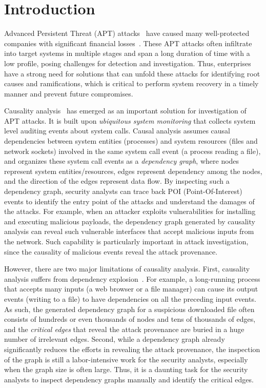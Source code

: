 \section{Introduction}
 Advanced Persistent Threat (APT) attacks~\cite{fireeye:anatomy,aptsymantec} have caused many well-protected companies with significant financial losses~\cite{ebay,opm,target,homedepot,ya:yahooleak}.
These APT attacks often infiltrate into target systems in multiple stages 
and span a long duration of time with a low profile, posing challenges for detection and investigation.
Thus, enterprises have a strong need for solutions that can unfold these attacks for identifying root causes and ramifications,
which is critical to perform system recovery in a timely manner and prevent future compromises.

Causality analysis~\cite{backtracking,backtracking2,wormlog,logtracking,mcitracking} has emerged as an important solution for investigation of APT attacks. It is built upon \emph{ubiquitous system monitoring} that collects system level auditing events about system calls.
Causal analysis assumes causal dependencies between system entities (\eg processes) and system resources (\eg files and network sockets) involved in the same system call event (\eg a process reading a file),
and organizes these system call events as a \emph{dependency graph}, where nodes represent system entities/resources, edges represent dependency among the nodes, and the direction of the edges represent data flow.
By inspecting such a dependency graph, security analysts can trace back POI (Point-Of-Interest) events to identify the entry point of the attacks and understand the damages of the attacks. 
For example, when an attacker exploits vulnerabilities for installing and executing malicious payloads, the dependency graph generated by causality analysis can reveal such vulnerable interfaces that accept malicious inputs from the network.
Such capability is particularly important in attack investigation, since the causality of malicious events reveal the attack provenance.

However, there are two major limitations of causality analysis.
First, causality analysis suffers from dependency explosion~\cite{depexplosion,timelytrack}.
For example, a long-running process that accepts many inputs (\eg a web browser or a file manager) can cause its output events (\eg writing to a file) to have dependencies on all the preceding input events.
As such, the generated dependency graph for a suspicious downloaded file often consists of hundreds or even thousands of nodes and tens of thousands of edges,
and the \emph{critical edges} that reveal the attack provenance are buried in a huge number of irrelevant edges.
Second, while a dependency graph already significantly reduces the efforts in revealing the attack provenance, the inspection of the graph is still a labor-intensive work for the security analysts, especially when the graph size is often large.
Thus, it is a daunting task for the security analysts to inspect dependency graphs manually and identify the critical edges.


